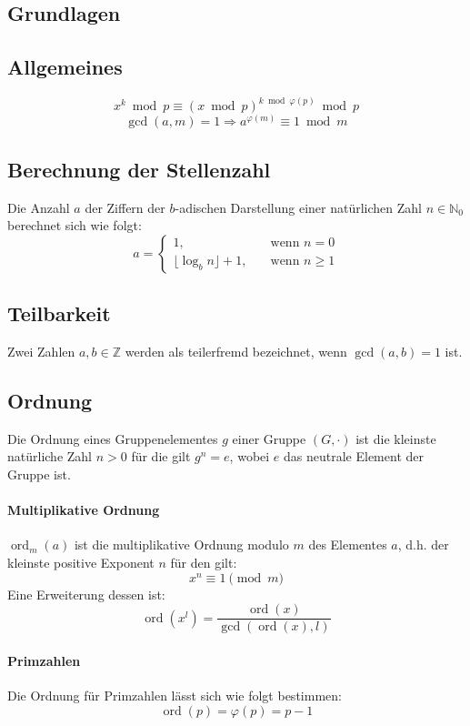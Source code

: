 \documentclass[a4paper,landscape]{article}
\title{Zusammenfassung \subject}
\author{Louis Seubert}
\newcommand{\ord}{\operatorname{ord}}
\begin{document}
\begin{multicols*}{4}
	\section{Grundlagen}
	\subsection*{Allgemeines}
	\[x^{k} \bmod p \equiv \left( x \bmod p \right)^{k \bmod \varphi(p)} \bmod p\]
	\[\gcd(a,m) = 1 \Rightarrow a^{\varphi(m)} \equiv 1 \bmod m\]

	\subsection*{Berechnung der Stellenzahl}
	Die Anzahl \(a\) der Ziffern der \(b\)-adischen Darstellung einer natürlichen
	Zahl \(n \in \mathbb{N}_{0}\) berechnet sich wie folgt:
	\[
		a =
		\begin{cases}
			1,                               & \quad \text{wenn } n = 0    \\
			\lfloor \log_{b}{n} \rfloor + 1, & \quad \text{wenn } n \geq 1
		\end{cases}
	\]

	\subsection*{Teilbarkeit}
	Zwei Zahlen \(a,b \in \mathbb{Z}\) werden als teilerfremd bezeichnet, wenn
	\(\gcd(a,b) = 1\) ist.

	\subsection*{Ordnung}
	Die Ordnung eines Gruppenelementes \(g\) einer Gruppe \((G,\cdot)\) ist die
	kleinste natürliche Zahl \(n > 0\) für die gilt \(g^{n} = e\), wobei \(e\)
	das neutrale Element der Gruppe ist.
	\paragraph*{Multiplikative Ordnung} \(\ord_{m}(a)\) ist die multiplikative
	Ordnung modulo \(m\) des Elementes \(a\), d.h. der kleinste positive Exponent
	\(n\) für den gilt: \[x^{n} \equiv 1 \pmod{m}\] Eine Erweiterung dessen ist:
	\[\ord(x^{l}) = \frac{\ord(x)}{\gcd(\ord(x),l)}\]
	\paragraph*{Primzahlen} Die Ordnung für Primzahlen lässt sich wie folgt
	bestimmen: \[\ord(p) = \varphi(p) = p -1 \]


\end{multicols*}
\end{document}
